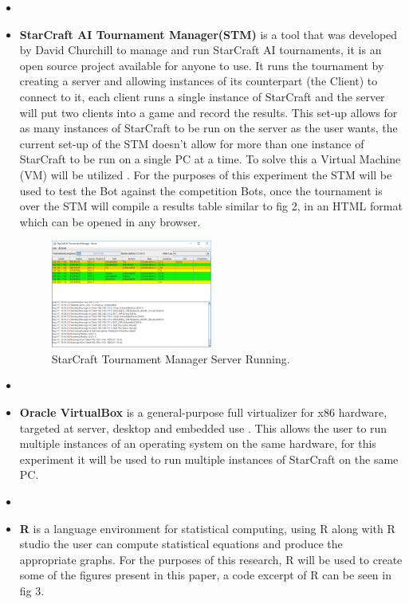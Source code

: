 \documentclass[journal]{IEEEtran}
\begin{document}
\begin{itemize}
		\item[]
		\item \textbf{StarCraft AI Tournament Manager(STM)} is a tool that was developed by David Churchill to manage and run StarCraft AI tournaments, it is an open source project available for anyone to use. It runs the tournament by creating a server and allowing instances of its counterpart (the Client) to connect to it, each client runs a single instance of StarCraft and the server will put two clients into a game and record the results. This set-up allows for as many instances of StarCraft to be run on the server as the user wants, the current set-up of the STM doesn't allow for more than one instance of StarCraft to be run on a single PC at a time. To solve this a Virtual Machine (VM) will be utilized \cite{Tournament}. For the purposes of this experiment the STM will be used to test the Bot against the competition Bots, once the tournament is over the STM will compile a results table similar to fig 2, in an HTML format which can be opened in any browser.
		\begin{figure}
			\centering
			\includegraphics[width=0.5\textwidth]{TMPic}
			\caption{StarCraft Tournament Manager Server Running.}
			\label{Fig2}
		\end{figure}
		\item[]
		\item \textbf{Oracle VirtualBox} is a general-purpose full virtualizer for x86 hardware, targeted at server, desktop and embedded use \cite{Virtual}. This allows the user to run multiple instances of an operating system on the same hardware, for this experiment it will be used to run multiple instances of StarCraft on the same PC. 
		\item[]
		\item \textbf{R} is a language environment for statistical computing, using R along with R studio the user can compute statistical equations and produce the appropriate graphs. For the purposes of this research, R will be used to create some of the figures present in this paper, a code excerpt of R can be seen in fig 3. 
		\newline
	\end{itemize}
	
\end{document}
